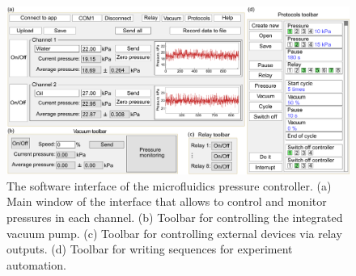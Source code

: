\documentclass[twoside, 12pt, a4paper]{refart}
\begin{document}
    \begin{figure}[H]
	  \begin{center}
	  \includegraphics[width=\textwidth]{imgs/menu panels.png}
	  \caption{The software interface of the microfluidics pressure controller. (a) Main window of the interface that allows to control and monitor pressures in each channel. (b) Toolbar for controlling the integrated vacuum pump. (c) Toolbar for controlling external devices via relay outputs. (d) Toolbar for writing sequences for experiment automation.}
	  \label{fig:menu panels}
	  \end{center}
    \end{figure}
   
\end{document}
